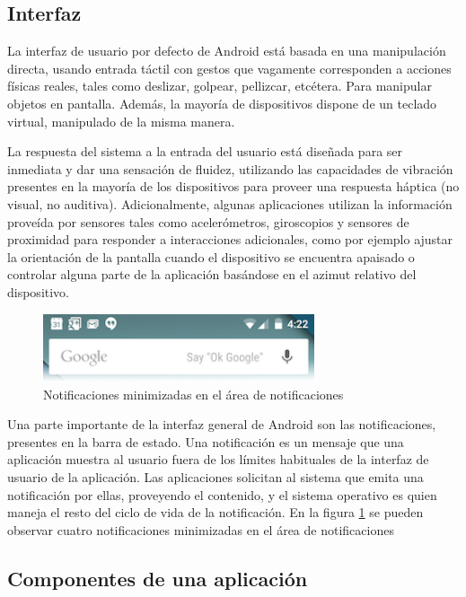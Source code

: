 \subsection{Interfaz}
    La interfaz de usuario por defecto de Android está basada en una manipulación directa, usando entrada táctil con gestos que vagamente corresponden a acciones físicas reales, tales como deslizar, golpear, pellizcar, etcétera. Para manipular objetos en pantalla. Además, la mayoría de dispositivos dispone de un teclado virtual, manipulado de la misma manera. 

    La respuesta del sistema a la entrada del usuario está diseñada para ser inmediata y dar una sensación de fluidez, utilizando las capacidades de vibración presentes en la mayoría de los dispositivos para proveer una respuesta háptica (no visual, no auditiva). Adicionalmente, algunas aplicaciones utilizan la información proveída por sensores tales como acelerómetros, giroscopios y sensores de proximidad para responder a interacciones adicionales, como por ejemplo ajustar la orientación de la pantalla cuando el dispositivo se encuentra apaisado o controlar alguna parte de la aplicación basándose en el azimut relativo del dispositivo.

\begin{figure}[h] \centering
    \includegraphics[width=8cm]{graphs/notification_area.png} \caption{Notificaciones minimizadas en el área de notificaciones\cite{androiddevguide} }\label{fig:screen:notification}
\end{figure}

    Una parte importante de la interfaz general de Android son las notificaciones, presentes en la barra de estado. Una notificación es un mensaje que una aplicación muestra al usuario fuera de los límites habituales de la interfaz de usuario de la aplicación. Las aplicaciones solicitan al sistema que emita una notificación por ellas, proveyendo el contenido, y el sistema operativo es quien maneja el resto del ciclo de vida de la notificación. En la figura \ref{fig:screen:notification} se pueden observar cuatro notificaciones minimizadas en el área de notificaciones

\subsection{Componentes de una aplicación}

